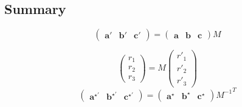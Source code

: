 \documentclass[12pt, a4paper]{article}
\begin{document}
\subsection{Summary}

\begin{equation}
  \begin{pmatrix}
    \bm{a}' & \bm{b}' & \bm{c}'
  \end{pmatrix}
  =
  \begin{pmatrix}
    \bm{a} & \bm{b} & \bm{c}
  \end{pmatrix}
  M
\end{equation} 

\begin{equation}
  \begin{pmatrix}
    r_1\\
    r_2\\
    r_3
  \end{pmatrix}
  = M
  \begin{pmatrix}
    r'_1\\
    r'_2\\
    r'_3
  \end{pmatrix}
\end{equation} 
\begin{equation}
  \begin{pmatrix}
    \bm{a}^{\star\prime} & \bm{b}^{\star\prime} & \bm{c}^{\star\prime}
  \end{pmatrix}
  =
  \begin{pmatrix}
    \bm{a}^{\star} & \bm{b}^{\star} & \bm{c}^{\star}
  \end{pmatrix}
  {M^{-1}}^{T}
\end{equation} 
\end{document}
